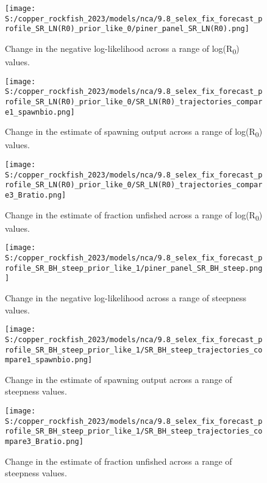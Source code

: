 \documentclass[
  letterpaper,
]{article}
\begin{document}
\begin{figure}
\centering
\texttt{[image: S:/copper\_rockfish\_2023/models/nca/9.8\_selex\_fix\_forecast\_profile\_SR\_LN(R0)\_prior\_like\_0/piner\_panel\_SR\_LN(R0).png]}
\caption{Change in the negative log-likelihood across a range of log(R\textsubscript{0}) values.\label{fig:r0-profile}}
\end{figure}

\pagebreak

\begin{figure}
\centering
\texttt{[image: S:/copper\_rockfish\_2023/models/nca/9.8\_selex\_fix\_forecast\_profile\_SR\_LN(R0)\_prior\_like\_0/SR\_LN(R0)\_trajectories\_compare1\_spawnbio.png]}
\caption{Change in the estimate of spawning output across a range of log(R\textsubscript{0}) values.\label{fig:r0-ssb}}
\end{figure}

\pagebreak

\begin{figure}
\centering
\texttt{[image: S:/copper\_rockfish\_2023/models/nca/9.8\_selex\_fix\_forecast\_profile\_SR\_LN(R0)\_prior\_like\_0/SR\_LN(R0)\_trajectories\_compare3\_Bratio.png]}
\caption{Change in the estimate of fraction unfished across a range of log(R\textsubscript{0}) values.\label{fig:r0-depl}}
\end{figure}

\pagebreak

\begin{figure}
\centering
\texttt{[image: S:/copper\_rockfish\_2023/models/nca/9.8\_selex\_fix\_forecast\_profile\_SR\_BH\_steep\_prior\_like\_1/piner\_panel\_SR\_BH\_steep.png]}
\caption{Change in the negative log-likelihood across a range of steepness values.\label{fig:h-profile}}
\end{figure}

\pagebreak

\begin{figure}
\centering
\texttt{[image: S:/copper\_rockfish\_2023/models/nca/9.8\_selex\_fix\_forecast\_profile\_SR\_BH\_steep\_prior\_like\_1/SR\_BH\_steep\_trajectories\_compare1\_spawnbio.png]}
\caption{Change in the estimate of spawning output across a range of steepness values.\label{fig:h-ssb}}
\end{figure}

\pagebreak

\begin{figure}
\centering
\texttt{[image: S:/copper\_rockfish\_2023/models/nca/9.8\_selex\_fix\_forecast\_profile\_SR\_BH\_steep\_prior\_like\_1/SR\_BH\_steep\_trajectories\_compare3\_Bratio.png]}
\caption{Change in the estimate of fraction unfished across a range of steepness values.\label{fig:h-depl}}
\end{figure}
\end{document}
